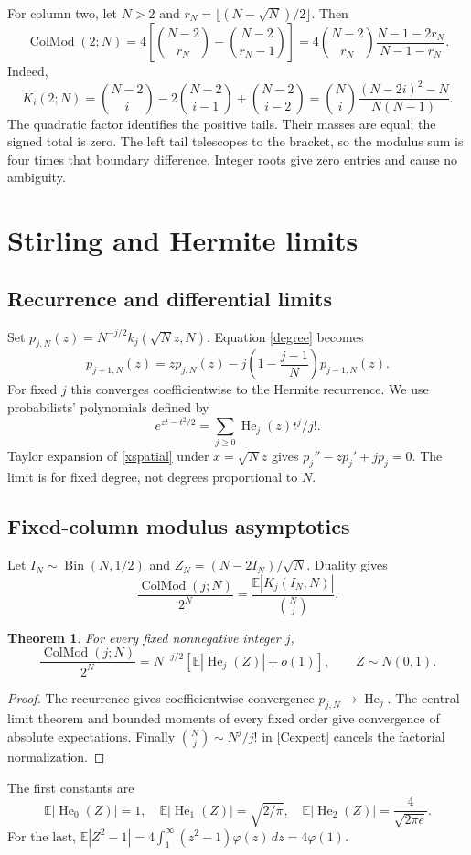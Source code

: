 \documentclass[11pt,reqno]{amsart}
\newtheorem{theorem}{Theorem}[section]
\theoremstyle{remark}\newtheorem{remark}[theorem]{Remark}
\newcommand{\E}{\mathbb E}
\newcommand{\He}{\operatorname{He}}
\DeclareMathOperator{\ColMod}{ColMod}
\begin{document}
For column two, let $N>2$ and $r_N=\lfloor(N-\sqrt N)/2\rfloor$. Then
\begin{equation}\label{C2}
\ColMod(2;N)=4\left[\binom{N-2}{r_N}-\binom{N-2}{r_N-1}\right]
=4\binom{N-2}{r_N}\frac{N-1-2r_N}{N-1-r_N}.
\end{equation}
Indeed,
\[
K_i(2;N)=\binom{N-2}i-2\binom{N-2}{i-1}+\binom{N-2}{i-2}
=\binom Ni\frac{(N-2i)^2-N}{N(N-1)}.
\]
The quadratic factor identifies the positive tails. Their masses are equal; the signed total is zero. The left tail telescopes to the bracket, so the modulus sum is four times that boundary difference. Integer roots give zero entries and cause no ambiguity.

\section{Stirling and Hermite limits}
\subsection{Recurrence and differential limits}
Set $p_{j,N}(z)=N^{-j/2}k_j(\sqrt Nz,N)$. Equation \eqref{degree} becomes
\[
p_{j+1,N}(z)=zp_{j,N}(z)-j\left(1-\frac{j-1}{N}\right)p_{j-1,N}(z).
\]
For fixed $j$ this converges coefficientwise to the Hermite recurrence. We use probabilists' polynomials defined by
\[
e^{zt-t^2/2}=\sum_{j\ge0}\He_j(z)t^j/j!.
\]
Taylor expansion of \eqref{xspatial} under $x=\sqrt Nz$ gives $p_j''-zp_j'+jp_j=0$. The limit is for fixed degree, not degrees proportional to $N$.

\subsection{Fixed-column modulus asymptotics}
Let $I_N\sim\operatorname{Bin}(N,1/2)$ and $Z_N=(N-2I_N)/\sqrt N$. Duality gives
\begin{equation}\label{Cexpect}
\frac{\ColMod(j;N)}{2^N}=\frac{\E|K_j(I_N;N)|}{\binom Nj}.
\end{equation}
\begin{theorem}\label{fixedcolumn}
For every fixed nonnegative integer $j$,
\begin{equation}\label{fixedasym}
\boxed{\frac{\ColMod(j;N)}{2^N}=N^{-j/2}
[\E|\He_j(Z)|+o(1)],\qquad Z\sim N(0,1).}
\end{equation}
\end{theorem}
\begin{proof}
The recurrence gives coefficientwise convergence $p_{j,N}\to\He_j$. The central limit theorem and bounded moments of every fixed order give convergence of absolute expectations. Finally $\binom Nj\sim N^j/j!$ in \eqref{Cexpect} cancels the factorial normalization.
\end{proof}
The first constants are
\[
\E|\He_0(Z)|=1,\quad \E|\He_1(Z)|=\sqrt{2/\pi},\quad
\E|\He_2(Z)|=\frac4{\sqrt{2\pi e}}.
\]
For the last, $\E|Z^2-1|=4\int_1^\infty(z^2-1)\varphi(z)\,dz=4\varphi(1)$.
\end{document}
